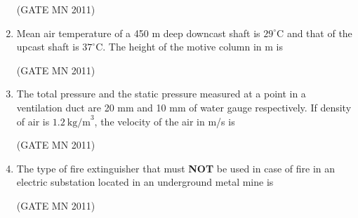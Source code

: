 \documentclass[journal]{IEEEtran}
\begin{document}
\begin{enumerate}
\hfill(GATE MN 2011)

\begin{enumerate}
\end{enumerate}

\item Mean air temperature of a 450 m deep downcast shaft is $29^\circ$C and that of the upcast shaft is $37^\circ$C. The height of the motive column in m is

	\hfill(GATE MN 2011)
\begin{enumerate}
\end{enumerate}

\item The total pressure and the static pressure measured at a point in a ventilation duct are 20 mm and 10 mm of water gauge respectively. If density of air is $1.2\ \text{kg/m}^3$, the velocity of the air in m/s is

	\hfill(GATE MN 2011)
\begin{enumerate}
\end{enumerate}

\item The type of fire extinguisher that must \textbf{NOT} be used in case of fire in an electric substation located in an underground metal mine is

	\hfill(GATE MN 2011)
\begin{enumerate}
\end{enumerate}


\end{enumerate}
\end{document}
